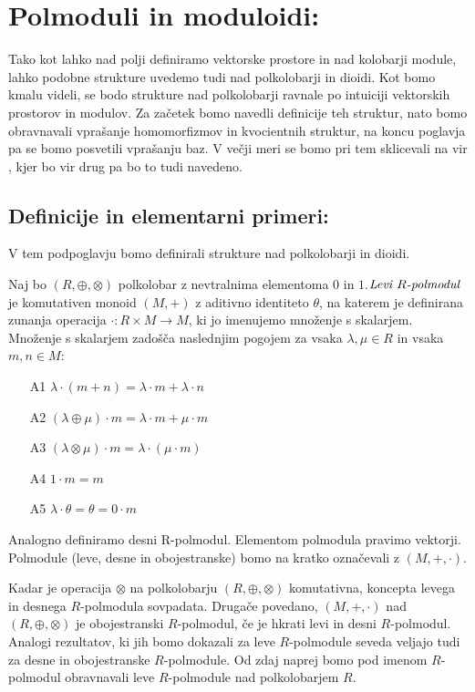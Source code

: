 \documentclass[mat1]{fmfdelo}
\newcommand{\pojem}[1]{\ensuremath{\emph{#1}}}
\newcommand{\map}[3]{\ensuremath{{#1}:{#2}\rightarrow{#3}}}
\begin{document}
\section{Polmoduli in moduloidi:}\label{sect:semimodule}
Tako kot lahko nad polji definiramo vektorske prostore in nad kolobarji module, lahko podobne strukture uvedemo tudi nad polkolobarji in dioidi. Kot bomo kmalu videli, se bodo strukture nad polkolobarji ravnale po intuiciji vektorskih prostorov in modulov. Za začetek bomo navedli definicije teh struktur, nato bomo obravnavali vprašanje homomorfizmov in kvocientnih struktur, na koncu poglavja pa se bomo posvetili vprašanju baz. V večji meri se bomo pri tem sklicevali na vir \cite[poglavje 5.\,2.\,]{bib:Gondran}, kjer bo vir drug pa bo to tudi navedeno.
\subsection{Definicije in elementarni primeri:} \label{subsect:semimoduledef}
V tem podpoglavju bomo definirali strukture nad polkolobarji in dioidi.

\begin{definicija}\label{def:polmodul}
	Naj bo $(R, \oplus, \otimes)$ polkolobar z nevtralnima elementoma $0$ in $1$.\newline\pojem{Levi $R$-polmodul}~ je komutativen monoid $(M, +)$ z aditivno identiteto $\theta$, na katerem je definirana zunanja operacija \map{\cdot}{R\times M}{M}, ki jo imenujemo množenje s skalarjem. Množenje s skalarjem zadošča naslednjim pogojem za vsaka $\lambda,\mu\in R$ in vsaka $m, n\in M$:
	\begin{enumerate}
		\item[A1] $\lambda\cdot(m + n) = \lambda\cdot m + \lambda\cdot n$
		\item[A2] $(\lambda \oplus \mu)\cdot m = \lambda\cdot m + \mu\cdot m$
		\item[A3]  $(\lambda\otimes\mu) \cdot m = \lambda \cdot (\mu \cdot m)$
		\item[A4] $1\cdot m = m$
		\item[A5] $\lambda\cdot\theta = \theta = 0\cdot m$
	\end{enumerate}

Analogno definiramo desni R-polmodul. Elementom polmodula pravimo vektorji. Polmodule (leve, desne in obojestranske) bomo na kratko označevali z $(M, +, \cdot)$.
\end{definicija}

	 Kadar je operacija $\otimes$ na polkolobarju $(R,\oplus, \otimes)$ komutativna, koncepta levega in desnega $R$-polmodula sovpadata. Drugače povedano, $(M, +, \cdot)$ nad $(R, \oplus, \otimes)$ je obojestranski $R$-polmodul, če je hkrati levi in desni $R$-polmodul. Analogi rezultatov, ki jih bomo dokazali za leve $R$-polmodule seveda veljajo  tudi za desne in obojestranske $R$-polmodule. Od zdaj naprej bomo pod imenom $R$-polmodul obravnavali leve $R$-polmodule nad polkolobarjem $R$.
\end{document}
